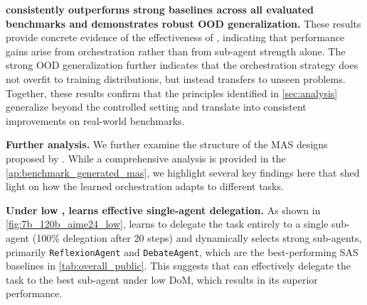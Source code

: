 \textbf{\ourframework consistently outperforms strong baselines across all evaluated benchmarks and demonstrates robust OOD generalization.}
These results provide concrete evidence of the effectiveness of
\ourframework, 
indicating that performance gains arise from orchestration rather
than from sub-agent strength alone. 
The strong OOD generalization further indicates that the orchestration strategy does not overfit to training distributions, but instead transfers to unseen problems.
Together, these results confirm that the
principles identified in \cref{sec:analysis} generalize beyond the controlled
setting and translate into consistent improvements on real-world benchmarks.





\textbf{Further analysis.} We further examine the structure of the MAS designs proposed by
\ourframework. While a comprehensive analysis is provided in the \cref{ap:benchmark_generated_mas}, we
highlight several key findings here that shed light on how the learned
orchestration adapts to different tasks. 


\textbf{Under low \masness, \ourframework learns effective single-agent delegation.}
As shown in \cref{fig:7b_120b_aime24_low}, \ourframework learns to delegate the task entirely to
a single sub-agent (100\% delegation after 20 steps) and dynamically selects
strong sub-agents, primarily \texttt{ReflexionAgent} and \texttt{DebateAgent},
which are the best-performing SAS baselines in
\cref{tab:overall_public}.
This suggests that \ourframework can effectively delegate the task to the best sub-agent under low DoM, which results in its superior performance.


